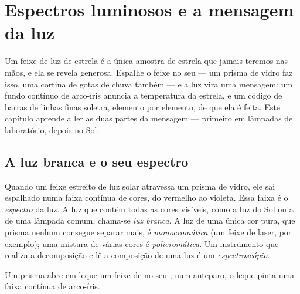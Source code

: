 \chapter{Espectros luminosos e a mensagem da luz}\label{ch:g10:light-spectra}

Um feixe de luz de estrela é a única amostra de estrela que jamais teremos
nas mãos, e ela se revela generosa. Espalhe o feixe no seu  --- um
prisma de vidro faz isso, uma cortina de gotas de chuva também --- e a luz
vira uma mensagem: um fundo contínuo de arco-íris anuncia a temperatura da
estrela, e um código de barras de linhas finas soletra, elemento por
elemento, de que ela é feita. Este capítulo aprende a ler as duas partes da
mensagem --- primeiro em lâmpadas de laboratório, depois no Sol.

\section{A luz branca e o seu espectro}

\begin{definition}\label{def:g10:light-spectra:white}
Quando um feixe estreito de luz solar atravessa um prisma de vidro, ele sai
espalhado numa faixa contínua de cores, do vermelho ao violeta. Essa faixa é
o \emph{espectro} da luz. A luz que contém todas as cores
visíveis, como a luz do Sol ou a de uma lâmpada comum, chama-se \emph{luz
branca}. A luz de uma única cor pura, que prisma nenhum
consegue separar mais, é \emph{monocromática} (um
feixe de laser, por exemplo); uma mistura de várias cores é
\emph{policromática}. Um instrumento que realiza a
decomposição e lê a composição de uma luz é um
\emph{espectroscópio}.
\end{definition}

\begin{omfigure}

{\small Um prisma abre em leque um feixe de  no seu ; num
anteparo, o leque pinta uma faixa contínua de arco-íris.}
\end{omfigure}

